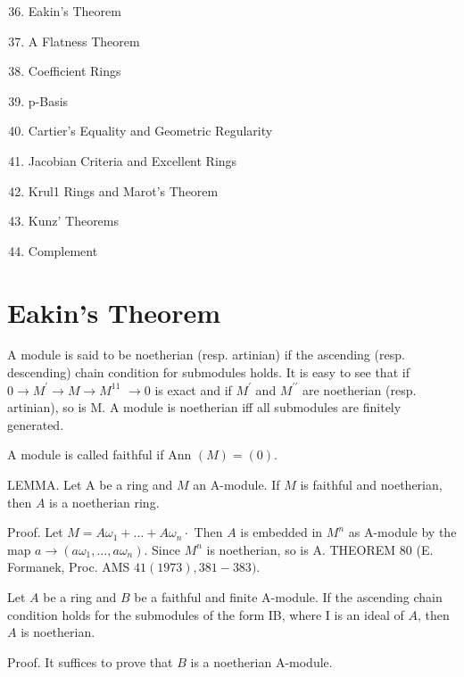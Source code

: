 \begin{enumerate}
  \setcounter{enumi}{35}
  \item Eakin's Theorem

  \item A Flatness Theorem

  \item Coefficient Rings

  \item p-Basis

  \item Cartier's Equality and Geometric Regularity

  \item Jacobian Criteria and Excellent Rings

  \item Krul1 Rings and Marot's Theorem

  \item Kunz' Theorems

  \item Complement

\end{enumerate}
\section{Eakin's Theorem}
A module is said to be noetherian (resp. artinian) if the ascending (resp. descending) chain condition for submodules holds. It is easy to see that if $0 \rightarrow M^{\prime} \rightarrow M \rightarrow M^{11}$ $\rightarrow 0$ is exact and if $M^{\prime}$ and $M^{\prime \prime}$ are noetherian (resp. artinian), so is M. A module is noetherian iff all submodules are finitely generated.

A module is called faithful if Ann $(M)=(0)$.

LEMMA. Let A be a ring and $M$ an A-module. If $M$ is faithful and noetherian, then $A$ is a noetherian ring.

Proof. Let $M=A \omega_{1}+\ldots+A \omega_{n} \cdot$ Then $A$ is embedded in $M^{n}$ as A-module by the map $a \rightarrow\left(a \omega_{1}, \ldots, a \omega_{n}\right)$. Since $M^{n}$ is noetherian, so is A. THEOREM 80 (E. Formanek, Proc. AMS $41(1973), 381-383) .$

Let $A$ be a ring and $B$ be a faithful and finite A-module. If the ascending chain condition holds for the submodules of the form IB, where I is an ideal of $A$, then $A$ is noetherian.

Proof. It suffices to prove that $B$ is a noetherian A-module.

